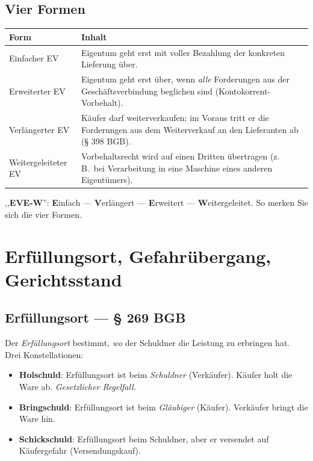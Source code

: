 \documentclass[11pt, a4paper]{article}
\begin{document}
\subsection{Vier Formen}

\begin{center}
\begin{tabular}{p{4cm} p{10cm}}
\toprule
\textbf{Form} & \textbf{Inhalt}\\
\midrule
Einfacher EV & Eigentum geht erst mit voller Bezahlung der konkreten Lieferung über.\\
Erweiterter EV & Eigentum geht erst über, wenn \emph{alle} Forderungen aus der Geschäftsverbindung beglichen sind (Kontokorrent-Vorbehalt).\\
Verlängerter EV & Käufer darf weiterverkaufen; im Voraus tritt er die Forderungen aus dem Weiterverkauf an den Lieferanten ab (§ 398 BGB).\\
Weitergeleiteter EV & Vorbehaltsrecht wird auf einen Dritten übertragen (z.\,B.\ bei Verarbeitung in eine Maschine eines anderen Eigentümers).\\
\bottomrule
\end{tabular}
\end{center}

\begin{eselsbruecke}
,,\textbf{EVE-W}'': \textbf{E}infach --- \textbf{V}erlängert --- \textbf{E}rweitert --- \textbf{W}eitergeleitet. So merken Sie sich die vier Formen.
\end{eselsbruecke}

\section{Erfüllungsort, Gefahrübergang, Gerichtsstand}

\subsection{Erfüllungsort --- § 269 BGB}

Der \emph{Erfüllungsort} bestimmt, \emph{wo} der Schuldner die Leistung zu erbringen hat.
Drei Konstellationen:

\begin{itemize}[itemsep=2pt]
  \item \textbf{Holschuld}: Erfüllungsort ist beim \emph{Schuldner} (Verkäufer). Käufer holt die Ware ab. \emph{Gesetzlicher Regelfall.}
  \item \textbf{Bringschuld}: Erfüllungsort ist beim \emph{Gläubiger} (Käufer). Verkäufer bringt die Ware hin.
  \item \textbf{Schickschuld}: Erfüllungsort beim Schuldner, aber er versendet auf Käufergefahr (Versendungskauf).
\end{itemize}
\end{document}
